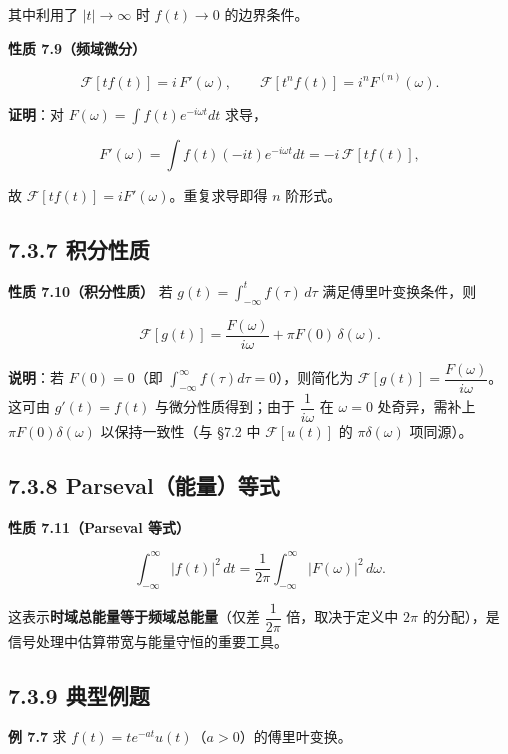 其中利用了 \(|t|\to\infty\) 时 \(f(t)\to0\) 的边界条件。

\textbf{性质 7.9（频域微分）}

\[
\mathcal F[t f(t)]=i\,F'(\omega),
\qquad
\mathcal F\left[t^n f(t)\right]=i^n F^{(n)}(\omega).
\]

\textbf{证明}：对 \(F(\omega)=\int f(t)e^{-i\omega t}dt\) 求导，

\[
F'(\omega)=\int f(t)(-it)e^{-i\omega t}dt=-i\,\mathcal F[t f(t)],
\]

故 \(\mathcal F[t f(t)]=iF'(\omega)\)。重复求导即得 \(n\) 阶形式。

\subsection{7.3.7 积分性质}\label{ux79efux5206ux6027ux8d28}

\textbf{性质 7.10（积分性质）} 若
\(g(t)=\displaystyle\int_{-\infty}^{t}f(\tau)\,d\tau\)
满足傅里叶变换条件，则

\[
\mathcal F[g(t)]=\frac{F(\omega)}{i\omega}+\pi F(0)\,\delta(\omega).
\]

\textbf{说明}：若 \(F(0)=0\)（即
\(\int_{-\infty}^{\infty}f(\tau)d\tau=0\)），则简化为
\(\mathcal F[g(t)]=\dfrac{F(\omega)}{i\omega}\)。这可由 \(g'(t)=f(t)\)
与微分性质得到；由于 \(\dfrac{1}{i\omega}\) 在 \(\omega=0\)
处奇异，需补上 \(\pi F(0)\delta(\omega)\) 以保持一致性（与 §7.2 中
\(\mathcal F[u(t)]\) 的 \(\pi\delta(\omega)\) 项同源）。

\subsection{7.3.8
Parseval（能量）等式}\label{parsevalux80fdux91cfux7b49ux5f0f}

\textbf{性质 7.11（Parseval 等式）}

\[
\int_{-\infty}^{\infty}|f(t)|^2\,dt=\frac{1}{2\pi}\int_{-\infty}^{\infty}|F(\omega)|^2\,d\omega .
\]

这表示\textbf{时域总能量等于频域总能量}（仅差 \(\dfrac{1}{2\pi}\)
倍，取决于定义中 \(2\pi\)
的分配），是信号处理中估算带宽与能量守恒的重要工具。

\subsection{7.3.9 典型例题}\label{ux5178ux578bux4f8bux9898-4}

\textbf{例 7.7} 求 \(f(t)=t e^{-at}u(t)\)（\(a>0\)）的傅里叶变换。

